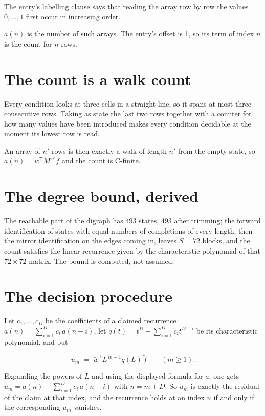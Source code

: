 \documentclass[11pt]{article}
\theoremstyle{definition}
\begin{document}
The entry's labelling clause says that reading the array row by row the values $0,\dots,1$ first occur in increasing order.

$a(n)$ is the number of such arrays. The entry's offset is 1, so its term of index $n$ is the count for $n$ rows.

\section{The count is a walk count}

Every condition looks at three cells in a straight line, so it spans at most three consecutive rows. Taking as state the last two rows together with a counter for how many values have been introduced makes every condition decidable at the moment its lowest row is read.

An array of $n'$ rows is then exactly a walk of length $n'$ from the empty state, so $a(n) = w^{\mathsf T}M^{\,n'}f$ and the count is C-finite.

\section{The degree bound, derived}

The reachable part of the digraph has $493$ states, $493$ after trimming; the forward identification of states with equal numbers of completions of every length, then the mirror identification on the edges coming in, leaves $S = 72$ blocks, and the count satisfies the linear recurrence given by the characteristic polynomial of that $72\times72$ matrix. The bound is computed, not assumed.

\section{The decision procedure}

Let $c_1,\dots,c_D$ be the coefficients of a claimed recurrence $a(n) = \sum_{i=1}^{D} c_i\,a(n-i)$, let $q(t) = t^{D} - \sum_{i=1}^{D} c_i t^{D-i}$ be its characteristic polynomial, and put

\[u_m \;=\; \tilde w^{\mathsf T} L^{\,m-1} q(L)\,\tilde f \qquad (m \ge 1).\]

Expanding the powers of $L$ and using the displayed formula for $a$, one gets $u_m = a(n) - \sum_{i=1}^{D} c_i\,a(n-i)$ with $n = m + D$. So $u_m$ is exactly the residual of the claim at that index, and the recurrence holds at an index $n$ if and only if the corresponding $u_m$ vanishes.
\end{document}
